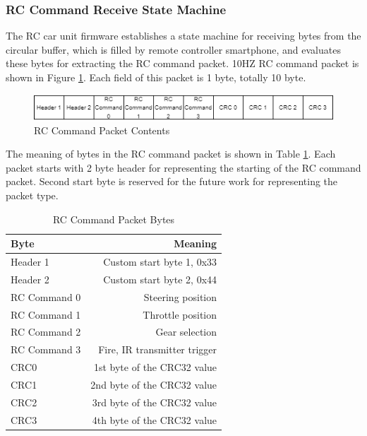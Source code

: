 \subsubsection{RC Command Receive State Machine}
\label{sec_rc_receive_machine}

The RC car unit firmware establishes a state machine for receiving bytes from the circular buffer, which is filled by remote controller smartphone, and evaluates these bytes for extracting the RC command packet. 10HZ RC command packet is shown in Figure \ref{fig:rc_packet}. Each field of this packet is 1 byte, totally 10 byte.

\begin{figure}[!htbp]
    \centering
    \includegraphics[width=1\textwidth]{Imgs/rc_packet.drawio.png}
    \caption{\label{fig:rc_packet}RC Command Packet Contents}
\end{figure}

The meaning of bytes in the RC command packet is shown in Table \ref{tab:rc_packet_content_table}. Each packet starts with 2 byte header for representing the starting of the RC command packet. Second start byte is reserved for the future work for representing the packet type.

\begin{table}[!htbp]
    \centering
    \caption{\label{tab:rc_packet_content_table}RC Command Packet Bytes}
    \begin{tabular}{l|r}
        Byte & Meaning \\\hline
        Header 1 & Custom start byte 1, 0x33 \\
        Header 2 & Custom start byte 2, 0x44 \\
        RC Command 0 & Steering position \\
        RC Command 1 & Throttle position \\
        RC Command 2 & Gear selection \\
        RC Command 3 & Fire, IR transmitter trigger \\
        CRC0 & 1st byte of the CRC32 value \\
        CRC1 & 2nd byte of the CRC32 value \\
        CRC2 & 3rd byte of the CRC32 value \\
        CRC3 & 4th byte of the CRC32 value \\
    \end{tabular}
\end{table}

